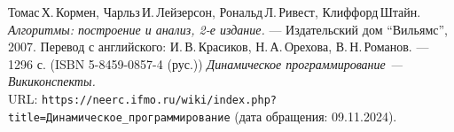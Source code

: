 \begin{thebibliography}{99}
Томас\,Х.\,Кормен, Чарльз\,И.\,Лейзерсон, Рональд\,Л.\,Ривест, Клиффорд\,Штайн.
{\itshape Алгоритмы: построение и анализ, 2-е издание.} --- Издательский дом \enquote{Вильямс}, 2007. Перевод с английского: И.\,В.\,Красиков, Н.\,А.\,Орехова, В.\,Н.\,Романов. --- 1296 с. (ISBN 5-8459-0857-4 (рус.))
{\itshape Динамическое программирование — Викиконспекты.} \\URL: \texttt{https://neerc.ifmo.ru/wiki/index.php?title=Динамическое\_программирование} (дата обращения: 09.11.2024).
\end{thebibliography}
\pagebreak
